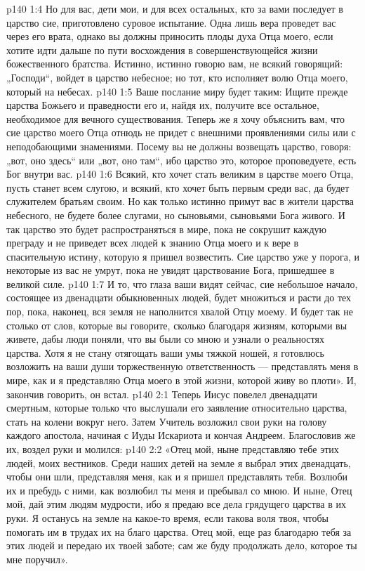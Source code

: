 \vs p140 1:4 Но для вас, дети мои, и для всех остальных, кто за вами последует в царство сие, приготовлено суровое испытание. Одна лишь вера проведет вас через его врата, однако вы должны приносить плоды духа Отца моего, если хотите идти дальше по пути восхождения в совершенствующейся жизни божественного братства. Истинно, истинно говорю вам, не всякий говорящий: „Господи“, войдет в царство небесное; но тот, кто исполняет волю Отца моего, который на небесах.
\vs p140 1:5 Ваше послание миру будет таким: Ищите прежде царства Божьего и праведности его и, найдя их, получите все остальное, необходимое для вечного существования. Теперь же я хочу объяснить вам, что сие царство моего Отца отнюдь не придет с внешними проявлениями силы или с неподобающими знамениями. Посему вы не должны возвещать царство, говоря: „вот, оно здесь“ или „вот, оно там“, ибо царство это, которое проповедуете, есть Бог внутри вас.
\vs p140 1:6 Всякий, кто хочет стать великим в царстве моего Отца, пусть станет всем слугою, и всякий, кто хочет быть первым среди вас, да будет служителем братьям своим. Но как только истинно примут вас в жители царства небесного, не будете более слугами, но сыновьями, сыновьями Бога живого. И так царство это будет распространяться в мире, пока не сокрушит каждую преграду и не приведет всех людей к знанию Отца моего и к вере в спасительную истину, которую я пришел возвестить. Сие царство уже у порога, и некоторые из вас не умрут, пока не увидят царствование Бога, пришедшее в великой силе.
\vs p140 1:7 И то, что глаза ваши видят сейчас, сие небольшое начало, состоящее из двенадцати обыкновенных людей, будет множиться и расти до тех пор, пока, наконец, вся земля не наполнится хвалой Отцу моему. И будет так не столько от слов, которые вы говорите, сколько благодаря жизням, которыми вы живете, дабы люди поняли, что вы были со мною и узнали о реальностях царства. Хотя я не стану отягощать ваши умы тяжкой ношей, я готовлюсь возложить на ваши души торжественную ответственность --- представлять меня в мире, как и я представляю Отца моего в этой жизни, которой живу во плоти». И, закончив говорить, он встал.
\vs p140 2:1 Теперь Иисус повелел двенадцати смертным, которые только что выслушали его заявление относительно царства, стать на колени вокруг него. Затем Учитель возложил свои руки на голову каждого апостола, начиная с Иуды Искариота и кончая Андреем. Благословив же их, воздел руки и молился:
\vs p140 2:2 «Отец мой, ныне представляю тебе этих людей, моих вестников. Среди наших детей на земле я выбрал этих двенадцать, чтобы они шли, представляя меня, как и я пришел представлять тебя. Возлюби их и пребудь с ними, как возлюбил ты меня и пребывал со мною. И ныне, Отец мой, дай этим людям мудрости, ибо я предаю все дела грядущего царства в их руки. Я останусь на земле на какое\hyp{}то время, если такова воля твоя, чтобы помогать им в трудах их на благо царства. Отец мой, еще раз благодарю тебя за этих людей и передаю их твоей заботе; сам же буду продолжать дело, которое ты мне поручил».
